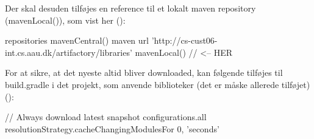 Der skal desuden tilføjes en reference til et lokalt maven repository (mavenLocal()), som vist her ():

\begin{gradlecode}[caption=Dekleration af repositories,label=lst:decl_repo]
repositories {
    mavenCentral()
    maven {
        url 'http://cs-cust06-int.cs.aau.dk/artifactory/libraries'
    }
    mavenLocal() // <-- HER
}
\end{gradlecode}

For at sikre, at det nyeste  altid bliver downloaded, kan følgende tilføjes til build.gradle i det projekt, som anvende biblioteker (det er måske allerede tilføjet) ():

\begin{gradlecode}[caption=Kode til at altid at bruge det nyeste snapshot,label=lst:always_newest_snapshot]
// Always download latest snapshot
configurations.all {
    resolutionStrategy.cacheChangingModulesFor 0, 'seconds'
}
\end{gradlecode}